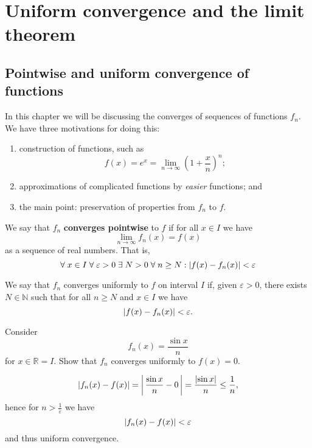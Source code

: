 \chapter{Uniform convergence and the limit theorem}

\section{Pointwise and uniform convergence of functions}

In this chapter we will be discussing the converges of sequences of functions $f_n$. We have three motivations for doing this:
\begin{enumerate}
    \item construction of functions, such as \[ f(x) = e^x = \lim_{n \to \infty} \left(1 + \frac xn \right)^n; \]
    \item approximations of complicated functions by \emph{easier} functions; and
    \item the main point: preservation of properties from $f_n$ to $f$.
\end{enumerate}

\begin{definition}
    We say that $f_n$ \textbf{converges pointwise} to $f$ if for all $x \in I$ we have \[ \lim_{n \to \infty} f_n(x) = f(x) \] as a sequence of real numbers. That is, \[ \forall \; x \in I \; \forall \; \varepsilon > 0 \; \exists \; N > 0 \; \forall \; n \geq N : \lvert f(x) - f_n(x)\rvert < \varepsilon \]
\end{definition}

\begin{definition}
    We say that $f_n$ converges uniformly to $f$ on interval $I$ if, given $\varepsilon > 0$, there exists $N \in \mathbb N$ such that for all $n \geq N$ and $x \in I$ we have \[ \lvert f(x) - f_n(x)\rvert < \varepsilon. \]
\end{definition}

\begin{example}
    Consider \[ f_n(x) = \frac{\sin{x}}{n} \] for $x \in \mathbb R = I$. Show that $f_n$ converges uniformly to $f(x) = 0$.
\end{example}

\begin{solution}
    \[ \lvert f_n(x) - f(x)\rvert = \left| \, \frac{\sin{x}}{n} - 0 \, \right| = \frac{\lvert\sin{x}\rvert}{n} \leq \frac1n, \] hence for $n > \frac{1}{\varepsilon}$ we have \[ \lvert f_n(x) - f(x)\rvert < \varepsilon \] and thus uniform convergence.
\end{solution}

